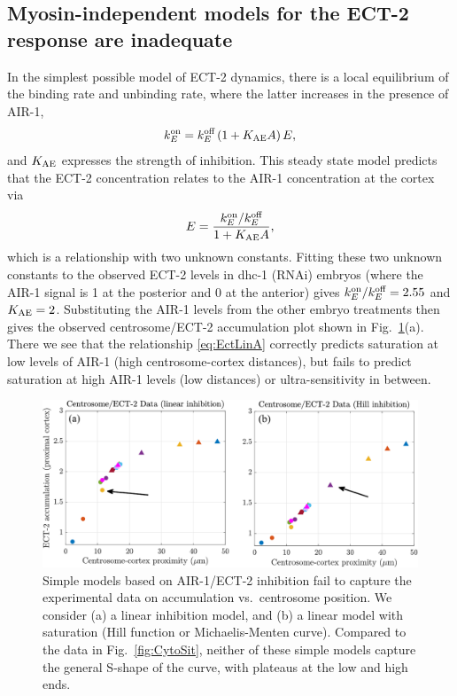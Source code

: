 \documentclass[11pt]{article}
\begin{document}
\subsection{Myosin-independent models for the ECT-2 response are inadequate}
In the simplest possible model of ECT-2 dynamics, there is a local equilibrium of the binding rate and unbinding rate, where the latter increases in the presence of AIR-1,
\begin{equation}
\label{eq:EctA}
 k^\text{on}_E = k^\text{off}_E \left(1+K_\text{AE} A \right)E,
\end{equation}
and $K_\text{AE}$ expresses the strength of inhibition. This steady state model predicts that the ECT-2 concentration relates to the AIR-1 concentration at the cortex via
\begin{equation}
\label{eq:EctLinA}
E = \frac{k^\text{on}_E/ k^\text{off}_E}{ 1+K_\text{AE} A},
\end{equation}
which is a relationship with two unknown constants. Fitting these two unknown constants to the observed ECT-2 levels in dhc-1 (RNAi) embryos (where the AIR-1 signal is 1 at the posterior and 0 at the anterior) gives $k^\text{on}_E/ k^\text{off}_E=2.55$ and $K_\text{AE}=2$. Substituting the AIR-1 levels from the other embryo treatments then gives the observed centrosome/ECT-2 accumulation plot shown in Fig.\ \ref{fig:LinFail}(a). There we see that the relationship \eqref{eq:EctLinA} correctly predicts saturation at low levels of AIR-1 (high centrosome-cortex distances), but fails to predict saturation at high AIR-1 levels (low distances) or ultra-sensitivity in between. 

\begin{figure}
\centering
\includegraphics[width=\textwidth]{Glotzer/Fig3/Fig3-crop.pdf}
\caption{\label{fig:LinFail}Simple models based on AIR-1/ECT-2 inhibition fail to capture the experimental data on accumulation vs.\ centrosome position. We consider (a) a linear inhibition model, and (b) a linear model with saturation (Hill function or Michaelis-Menten curve). Compared to the data in Fig.\ \ref{fig:CytoSit}, neither of these simple models capture the general S-shape of the curve, with plateaus at the low and high ends. }
\end{figure}
\end{document}

